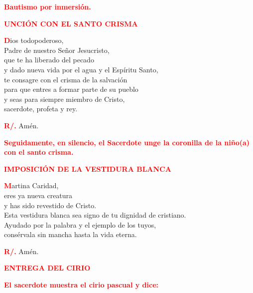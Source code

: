 \documentclass[12pt, letterpaper]{report}
\begin{document}
\large {\bfseries \textcolor{red}{Bautismo por inmersi\'on.}} \newline

\Large {\bfseries \textcolor{red}{UNCI\'ON CON EL SANTO CRISMA}}

\lettrine[lines=1]{\bfseries \textcolor{red}{D}}{}\Large ios todopoderoso, \\
Padre de nuestro Se\~nor Jesucristo, \\
que te ha liberado del pecado \\
y dado nueva vida por el agua y el Esp\'iritu Santo, \\
te consagre con el crisma de la salvaci\'on \\
para que entres a formar parte de su pueblo \\
y seas para siempre miembro de Cristo, \\
sacerdote, profeta y rey. \newline

\noindent
\Large {\bfseries \textcolor{red}{R/.}} \hspace{0.5cm} Am\'en. \newline

\large {\bfseries \textcolor{red}{Seguidamente, en silencio, el Sacerdote unge la coronilla de la ni\~no(a) con el santo crisma.}} \newline

\newpage

\Large {\bfseries \textcolor{red}{IMPOSICI\'ON DE LA VESTIDURA BLANCA}}

\lettrine[lines=1]{\bfseries \textcolor{red}{M}}{}\Large artina Caridad, \\ 
eres ya nueva creatura \\
y has sido revestido de Cristo. \\
Esta vestidura blanca sea signo de tu dignidad de cristiano. \\
Ayudado por la palabra y el ejemplo de los tuyos, \\
cons\'ervala sin mancha hasta la vida eterna. \newline

\noindent
\Large {\bfseries \textcolor{red}{R/.}} \hspace{0.5cm} Am\'en. \newline

\Large {\bfseries \textcolor{red}{ENTREGA DEL CIRIO}} \newline

\large {\bfseries \textcolor{red}{El sacerdote muestra el cirio pascual y dice:}} \newline
\end{document}
